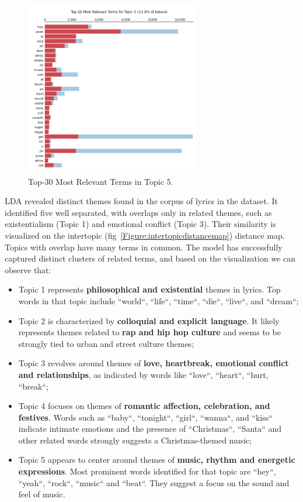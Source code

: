 \begin{center}
\begin{figure}[H]
  \centering
  \includegraphics[width=3in]{img/topics/png/t5.png}
  \caption{Top-30 Most Relevant Terms in Topic 5.}
  \label{Figure:fig_eh}
\end{figure}
\end{center}

LDA  revealed distinct themes found in the corpus of  lyrics in the dataset. It
identified five well separated, with overlaps only in related themes, such as
existentialism (Topic 1) and emotional conflict (Topic 3). Their similarity 
is visualized on the intertopic (fig~\ref{Figure:intertopicdistancemap})
distance map. Topics with overlap have  many terms in common. The model has
successfully captured distinct clusters of related terms, and based on the
visualization we can observe that:

\begin{itemize}
     \item Topic 1 represents \textbf{philosophical and existential} themes in lyrics.
      Top words in that topic include ``world``, ``life``, ``time``, ``die``,
      ``live``, and ``dream``;
    \item Topic 2 is characterized by \textbf{colloquial and explicit
      language}. It likely represents themes related to \textbf{rap and hip hop culture}
      and seems to be strongly tied to urban and street culture themes;
    \item Topic 3 revolves around themes of \textbf{love, heartbreak, emotional
      conflict and relationships}, as indicated by words like ``love``,
      ``heart``, ``hurt, ``break``;
    \item Topic 4 focuses on themes of \textbf{romantic affection, celebration,
      and festives}. Words such as ``baby``, ``tonight``, ``girl``, ``wanna``,
      and ``kiss`` indicate intimate emotions and the presence of
      ``Christmas``, ``Santa`` and other related words strongly suggests a
      Christmas-themed music;
    \item Topic 5 appears to center around themes of \textbf{music, rhythm and
      energetic expressions}. Most prominent words identified for that topic
      are ``hey``, ``yeah``, ``rock``, ``music`` and ``beat``. They suggest a
      focus on the sound and feel of music. 
\end{itemize}


